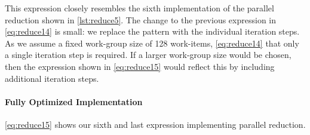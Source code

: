 %
This expression closely resembles the sixth implementation of the parallel reduction shown in \autoref{lst:reduce5}.
The change to the previous expression in \autoref{eq:reduce14} is small:
we replace the \iterateN pattern with the individual iteration steps.
As we assume a fixed work-group size of 128 work-items,  \autoref{eq:reduce14} that only a single iteration step is required.
If a larger work-group size would be chosen, then the expression shown in \autoref{eq:reduce15} would reflect this by including additional iteration steps.




\paragraph{Fully Optimized Implementation}
\autoref{eq:reduce15} shows our sixth and last expression implementing parallel reduction.
